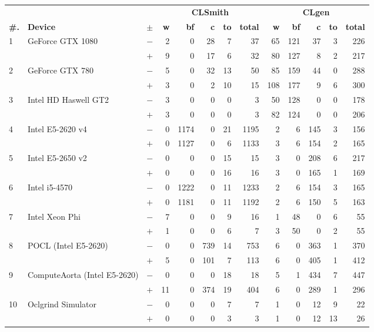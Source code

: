 \begin{tabular}{lll | rrrrr | rrrrr }
  \toprule
  & & & \multicolumn{5}{c|}{\textbf{CLSmith}} & \multicolumn{5}{c}{\textbf{CLgen}} \\
  \textbf{\#.} & \textbf{Device} & $\pm$ &
  \textbf{w} & \textbf{bf} & \textbf{c} & \textbf{to} & \textbf{total} &
  \textbf{w} & \textbf{bf} & \textbf{c} & \textbf{to} & \textbf{total} \\
  \midrule
  \multirow{ 2}{*}{1} & \multirow{ 2}{*}{GeForce GTX 1080} & $-$ & 2 & 0 & 28 & 7 & 37       & 65 & 121 & 37 & 3 & 226 \\& & $+$ & 9 & 0 & 17 & 6 & 32 & 80 & 127 & 8 & 2 & 217 \\
\hline
\multirow{ 2}{*}{2} & \multirow{ 2}{*}{GeForce GTX 780} & $-$ & 5 & 0 & 32 & 13 & 50       & 85 & 159 & 44 & 0 & 288 \\& & $+$ & 3 & 0 & 2 & 10 & 15 & 108 & 177 & 9 & 6 & 300 \\
\hline
\multirow{ 2}{*}{3} & \multirow{ 2}{*}{Intel HD Haswell GT2} & $-$ & 3 & 0 & 0 & 0 & 3       & 50 & 128 & 0 & 0 & 178 \\& & $+$ & 3 & 0 & 0 & 0 & 3 & 82 & 124 & 0 & 0 & 206 \\
\hline
\multirow{ 2}{*}{4} & \multirow{ 2}{*}{Intel E5-2620 v4} & $-$ & 0 & 1174 & 0 & 21 & 1195       & 2 & 6 & 145 & 3 & 156 \\& & $+$ & 0 & 1127 & 0 & 6 & 1133 & 3 & 6 & 154 & 2 & 165 \\
\hline
\multirow{ 2}{*}{5} & \multirow{ 2}{*}{Intel E5-2650 v2} & $-$ & 0 & 0 & 0 & 15 & 15       & 3 & 0 & 208 & 6 & 217 \\& & $+$ & 0 & 0 & 0 & 16 & 16 & 3 & 0 & 165 & 1 & 169 \\
\hline
\multirow{ 2}{*}{6} & \multirow{ 2}{*}{Intel i5-4570} & $-$ & 0 & 1222 & 0 & 11 & 1233       & 2 & 6 & 154 & 3 & 165 \\& & $+$ & 0 & 1181 & 0 & 11 & 1192 & 2 & 6 & 150 & 5 & 163 \\
\hline
\multirow{ 2}{*}{7} & \multirow{ 2}{*}{Intel Xeon Phi} & $-$ & 7 & 0 & 0 & 9 & 16       & 1 & 48 & 0 & 6 & 55 \\& & $+$ & 1 & 0 & 0 & 6 & 7 & 3 & 50 & 0 & 2 & 55 \\
\hline
\multirow{ 2}{*}{8} & \multirow{ 2}{*}{POCL (Intel E5-2620)} & $-$ & 0 & 0 & 739 & 14 & 753       & 6 & 0 & 363 & 1 & 370 \\& & $+$ & 5 & 0 & 101 & 7 & 113 & 6 & 0 & 405 & 1 & 412 \\
\hline
\multirow{ 2}{*}{9} & \multirow{ 2}{*}{ComputeAorta (Intel E5-2620)} & $-$ & 0 & 0 & 0 & 18 & 18       & 5 & 1 & 434 & 7 & 447 \\& & $+$ & 11 & 0 & 374 & 19 & 404 & 6 & 0 & 289 & 1 & 296 \\
\hline
\multirow{ 2}{*}{10} & \multirow{ 2}{*}{Oclgrind Simulator} & $-$ & 0 & 0 & 0 & 7 & 7       & 1 & 0 & 12 & 9 & 22 \\& & $+$ & 0 & 0 & 0 & 3 & 3 & 1 & 0 & 12 & 13 & 26 \\
  \bottomrule
\end{tabular}

